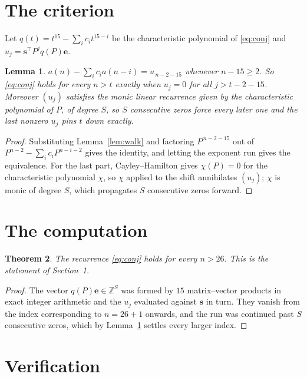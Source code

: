 \documentclass[11pt,a4paper]{article}
\theoremstyle{plain}
\newtheorem{theorem}{Theorem}
\newtheorem{lemma}[theorem]{Lemma}
\theoremstyle{definition}
\begin{document}
\section{The criterion}

Let $q(t)=t^{15}-\sum_i c_i t^{15-i}$ be the characteristic polynomial of
\eqref{eq:conj} and $u_j=\mathbf{s}^{\!\top}P^{j}q(P)\mathbf{e}$.

\begin{lemma}\label{lem:crit}
$a(n)-\sum_i c_i a(n-i)=u_{\,n-2-15}$ whenever $n-15\ge2$. So \eqref{eq:conj}
holds for every $n>t$ exactly when $u_j=0$ for all $j>t-2-15$. Moreover $(u_j)$
satisfies the monic linear recurrence given by the characteristic polynomial of $P$, of
degree $S$, so $S$ consecutive zeros force every later one and the last nonzero $u_j$ pins
$t$ down exactly.
\end{lemma}

\begin{proof}
Substituting Lemma~\ref{lem:walk} and factoring $P^{\,n-2-15}$ out of
$P^{n-2}-\sum_i c_i P^{n-i-2}$ gives the identity, and letting the exponent run gives the
equivalence. For the last part, Cayley--Hamilton gives $\chi(P)=0$ for the characteristic
polynomial $\chi$, so $\chi$ applied to the shift annihilates $(u_j)$; $\chi$ is monic of
degree $S$, which propagates $S$ consecutive zeros forward.
\end{proof}

\section{The computation}

\begin{theorem}
The recurrence \eqref{eq:conj} holds for every $n>26$. This is the statement of
Section~1.
\end{theorem}

\begin{proof}
The vector $q(P)\mathbf{e}\in\mathbb{Z}^{S}$ was formed by $15$ matrix--vector
products in exact integer arithmetic and the $u_j$ evaluated against $\mathbf{s}$ in turn.
They vanish from the index corresponding to $n=26+1$ onwards, and the run was continued
past $S$ consecutive zeros, which by Lemma~\ref{lem:crit} settles every larger index.
\end{proof}

\section{Verification}
\end{document}
